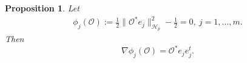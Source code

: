 \documentclass[ba]{imsart}
\newcommand{\R}{\ensuremath{\mathbb{R}}}
\newcommand{\hilp}{\mathcal{H}_p}
\newcommand{\obs}{\mathcal{O}}
\newcommand{\tr}[1]{\textup{tr}\left \{#1 \right \} }
\theoremstyle{plain}
\newtheorem{proposition}[theorem]{Proposition}
\theoremstyle{definition}
\theoremstyle{remark}
\providecommand{\DIFaddbegin}{} %
\providecommand{\DIFaddend}{} %
\providecommand{\DIFdelbegin}{} %
\providecommand{\DIFdelend}{} %
\newcommand{\DIFscaledelfig}{0.5}
\newlength{\DIFdelgraphicswidth} %
\newlength{\DIFdelgraphicsheight} %
\newcommand{\DIFaddincludegraphics}[2][]{{\color{blue}\fbox{\DIFOincludegraphics[#1]{#2}}}} %
\newcommand{\DIFdelincludegraphics}[2][]{%
\sbox{\DIFdelgraphicsbox}{\DIFOincludegraphics[#1]{#2}}%
\settoboxwidth{\DIFdelgraphicswidth}{\DIFdelgraphicsbox} %
\settoboxtotalheight{\DIFdelgraphicsheight}{\DIFdelgraphicsbox} %
\scalebox{\DIFscaledelfig}{%
\parbox[b]{\DIFdelgraphicswidth}{\usebox{\DIFdelgraphicsbox}\\[-\baselineskip] \rule{\DIFdelgraphicswidth}{0em}}\llap{\resizebox{\DIFdelgraphicswidth}{\DIFdelgraphicsheight}{%
\setlength{\unitlength}{\DIFdelgraphicswidth}%
\begin{picture}(1,1)%
\thicklines\linethickness{2pt} %
{\color[rgb]{1,0,0}\put(0,0){\framebox(1,1){}}}%
{\color[rgb]{1,0,0}\put(0,0){\line( 1,1){1}}}%
{\color[rgb]{1,0,0}\put(0,1){\line(1,-1){1}}}%
\end{picture}%
}\hspace*{3pt}}} %
} %
\DeclareRobustCommand{\DIFaddbegin}{\DIFOaddbegin \let\includegraphics\DIFaddincludegraphics} %
\DeclareRobustCommand{\DIFaddend}{\DIFOaddend \let\includegraphics\DIFOincludegraphics} %
\DeclareRobustCommand{\DIFdelbegin}{\DIFOdelbegin \let\includegraphics\DIFdelincludegraphics} %
\DeclareRobustCommand{\DIFdelend}{\DIFOaddend \let\includegraphics\DIFOincludegraphics} %
\begin{document}
\begin{proposition}\label{prop:constraints_grad}
  Let
  \begin{align*}
    \phi_j(\obs) :=\frac{1}{2} \| \obs^* e_j\|_{\hilp}^2 - \frac{1}{2} = 0,\ j=1,\dots,m.
  \end{align*}
  Then
  \DIFdelbegin %
\DIFdelend \DIFaddbegin \begin{equation*}
\nabla \phi_j(\obs) = \obs^* e_je_j^t.
  \end{equation*}\DIFaddend 
\end{proposition}







\DIFdelbegin %
\end{document}
